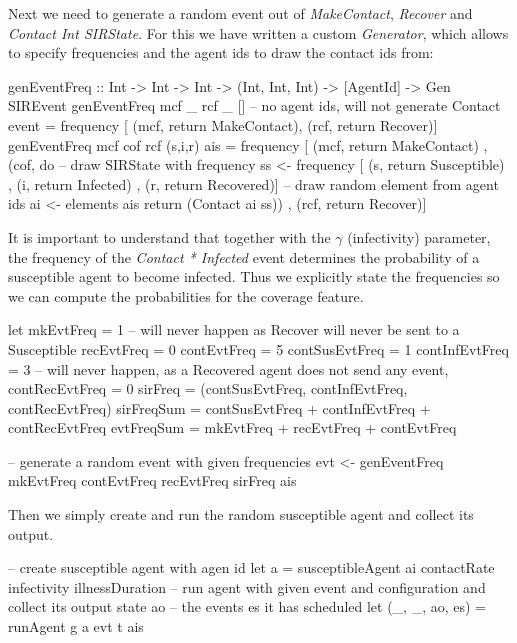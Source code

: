 Next we need to generate a random event out of \textit{MakeContact}, \textit{Recover} and \textit{Contact Int SIRState}. For this we have written a custom \textit{Generator}, which allows to specify frequencies and the agent ids to draw the contact ids from:

\begin{HaskellCode}
genEventFreq :: Int -> Int -> Int -> (Int, Int, Int) -> [AgentId] -> Gen SIREvent
genEventFreq mcf _ rcf _ []  
  -- no agent ids, will not generate Contact event
  = frequency [ (mcf, return MakeContact), (rcf, return Recover)]
genEventFreq mcf cof rcf (s,i,r) ais
  = frequency [ (mcf, return MakeContact)
              , (cof, do
                  -- draw SIRState with frequency 
                  ss <- frequency [ (s, return Susceptible)
                                  , (i, return Infected)
                                  , (r, return Recovered)]
                  -- draw random element from agent ids
                  ai <- elements ais
                  return (Contact ai ss))
              , (rcf, return Recover)]
\end{HaskellCode}

It is important to understand that together with the $\gamma$ (infectivity) parameter, the frequency of the \textit{Contact * Infected} event determines the probability of a susceptible agent to become infected. Thus we explicitly state the frequencies so we can compute the probabilities for the coverage feature.

\begin{HaskellCode}
let mkEvtFreq = 1
    -- will never happen as Recover will never be sent to a Susceptible
    recEvtFreq = 0
    contEvtFreq = 5
    contSusEvtFreq = 1
    contInfEvtFreq = 3
    -- will never happen, as a Recovered agent does not send any event,
    contRecEvtFreq = 0
    sirFreq    = (contSusEvtFreq, contInfEvtFreq, contRecEvtFreq)
    sirFreqSum = contSusEvtFreq + contInfEvtFreq + contRecEvtFreq
    evtFreqSum = mkEvtFreq + recEvtFreq + contEvtFreq
    
-- generate a random event with given frequencies
evt <- genEventFreq mkEvtFreq contEvtFreq recEvtFreq sirFreq ais
\end{HaskellCode}

Then we simply create and run the random susceptible agent and collect its output.

\begin{HaskellCode}
-- create susceptible agent with agen id
let a = susceptibleAgent ai contactRate infectivity illnessDuration
-- run agent with given event and configuration and collect its output state ao
-- the events es it has scheduled
let (_, _, ao, es) = runAgent g a evt t ais
\end{HaskellCode}


